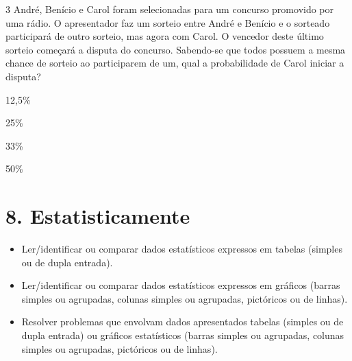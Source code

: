 {\num{3} André, Benício e Carol foram selecionadas para um
concurso promovido por uma rádio. O apresentador faz um sorteio entre
André e Benício e o sorteado participará de outro sorteio, mas agora com
Carol. O vencedor deste último sorteio começará a disputa do concurso. Sabendo-se
que todos possuem a mesma chance de sorteio ao participarem de um, qual a probabilidade de Carol iniciar a disputa?

\begin{escolha}
\item
  12,5\%
\item
  25\%
\item
  33\%
\item
  50\%
\end{escolha}



\chapter{8. Estatisticamente}



\begin{itemize}
\item Ler/identificar ou comparar dados estatísticos expressos em tabelas
(simples ou de dupla entrada).

\item Ler/identificar ou comparar dados estatísticos expressos em gráficos
(barras simples ou agrupadas, colunas simples ou agrupadas, pictóricos
ou de linhas).

\item Resolver problemas que envolvam dados apresentados tabelas (simples ou
de dupla entrada) ou gráficos estatísticos (barras simples ou agrupadas,
colunas simples ou agrupadas, pictóricos ou de linhas).
\end{itemize}

}
